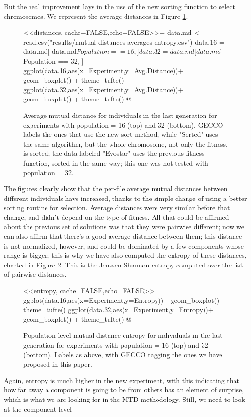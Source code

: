 \documentclass[sigconf]{acmart}
\begin{document}
But the real improvement lays in the use of the new sorting function
to select chromosomes. We represent the average distances in Figure
\ref{fig:md}.
%
\begin{figure}[h!tb]
<<distances, cache=FALSE,echo=FALSE>>=
data.md <- read.csv("results/mutual-distances-averages-entropy.csv")
data.16 = data.md[ data.md$Population == 16, ]
data.32 = data.md[ data.md$Population == 32, ]
ggplot(data.16,aes(x=Experiment,y=Avg.Distance))+ geom_boxplot() + theme_tufte()
ggplot(data.32,aes(x=Experiment,y=Avg.Distance))+ geom_boxplot() + theme_tufte()
@
\caption{Average mutual distance for individuals in the last
  generation for experiments with population = 16 (top) and 32
  (bottom). GECCO labels the ones that use the new sort method, while
  "Sorted" uses the same algorithm, but the whole chromosome, not only
the fitness, is sorted; the data labeled "Evostar" uses the previous
fitness function, sorted in the same way; this one was not tested with
population = 32.}
  \label{fig:md}
\end{figure}
%
The figures clearly show that the per-file average mutual distances
between different individuals have increased, thanks to the simple
change of using a better sorting routine for selection. Average
distances were very similar before that change, and didn't depend on
the type of fitness. All that could be affirmed about the previous set
of solutions was that they were pairwise different; now we can also
affirm that there's a good average distance between them; this
distance is not normalized, however, and could be dominated by a few
components whose range is bigger; this is why we have also computed
the entropy of these distances, charted in Figure
\ref{fig:entropy}. This is the Jenssen-Shannon entropy computed over
the list of pairwise distances.
%
\begin{figure}[h!tb]
<<entropy, cache=FALSE,echo=FALSE>>=
ggplot(data.16,aes(x=Experiment,y=Entropy))+ geom_boxplot() + theme_tufte()
ggplot(data.32,aes(x=Experiment,y=Entropy))+ geom_boxplot() + theme_tufte()
@
\caption{Population-level mutual distance entropy for individuals in the last
  generation for experiments with population = 16 (top) and 32
  (bottom). Labels as above, with GECCO tagging the ones we have
  proposed in this paper.}
  \label{fig:entropy}
\end{figure}
%
Again, entropy is much higher in the new experiment, with this
indicating that how far away a component is going to be from others
has an element of surprise, which is what we are looking for in the
MTD methodology. Still, we need to look at the component-level
\end{document}
